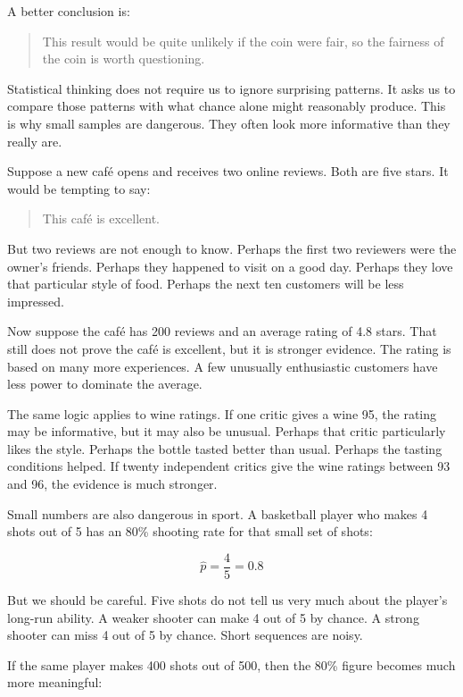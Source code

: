 \documentclass[
  letterpaper,
  DIV=11,
  numbers=noendperiod]{scrreprt}
\begin{document}
A better conclusion is:

\begin{quote}
This result would be quite unlikely if the coin were fair, so the
fairness of the coin is worth questioning.
\end{quote}

Statistical thinking does not require us to ignore surprising patterns.
It asks us to compare those patterns with what chance alone might
reasonably produce. This is why small samples are dangerous. They often
look more informative than they really are.

Suppose a new café opens and receives two online reviews. Both are five
stars. It would be tempting to say:

\begin{quote}
This café is excellent.
\end{quote}

But two reviews are not enough to know. Perhaps the first two reviewers
were the owner's friends. Perhaps they happened to visit on a good day.
Perhaps they love that particular style of food. Perhaps the next ten
customers will be less impressed.

Now suppose the café has 200 reviews and an average rating of 4.8 stars.
That still does not prove the café is excellent, but it is stronger
evidence. The rating is based on many more experiences. A few unusually
enthusiastic customers have less power to dominate the average.

The same logic applies to wine ratings. If one critic gives a wine 95,
the rating may be informative, but it may also be unusual. Perhaps that
critic particularly likes the style. Perhaps the bottle tasted better
than usual. Perhaps the tasting conditions helped. If twenty independent
critics give the wine ratings between 93 and 96, the evidence is much
stronger.

Small numbers are also dangerous in sport. A basketball player who makes
4 shots out of 5 has an 80\% shooting rate for that small set of shots:

\[
\hat{p} = \frac{4}{5} = 0.8
\]

But we should be careful. Five shots do not tell us very much about the
player's long-run ability. A weaker shooter can make 4 out of 5 by
chance. A strong shooter can miss 4 out of 5 by chance. Short sequences
are noisy.

If the same player makes 400 shots out of 500, then the 80\% figure
becomes much more meaningful:
\end{document}
